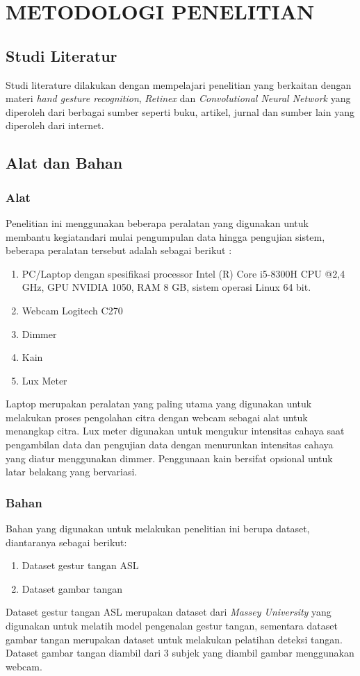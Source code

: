 \chapter{METODOLOGI PENELITIAN}
\section{Studi Literatur}
Studi literature dilakukan dengan mempelajari penelitian yang berkaitan dengan materi \emph{hand gesture recognition}, \emph{Retinex} dan \emph{Convolutional Neural Network} yang  diperoleh dari berbagai sumber seperti buku, artikel, jurnal dan sumber lain yang diperoleh dari internet.
\section{Alat dan Bahan}
\subsection{Alat}
Penelitian ini menggunakan beberapa peralatan yang digunakan untuk membantu kegiatandari mulai pengumpulan data hingga pengujian sistem, beberapa peralatan tersebut adalah sebagai berikut :
\begin{enumerate}
\item PC/Laptop dengan spesifikasi processor Intel (R) Core i5-8300H CPU @2,4 GHz, GPU NVIDIA 1050, RAM 8 GB, sistem operasi Linux 64 bit.
\item Webcam Logitech C270
\item Dimmer
\item Kain	
\item Lux Meter
\end{enumerate}
Laptop merupakan peralatan yang paling utama yang digunakan untuk melakukan proses pengolahan citra dengan webcam sebagai alat untuk menangkap citra. Lux meter digunakan untuk mengukur intensitas cahaya saat pengambilan data dan pengujian data dengan menurunkan intensitas cahaya yang diatur menggunakan dimmer. Penggunaan kain bersifat opsional untuk latar belakang yang bervariasi.
\subsection{Bahan}
Bahan yang digunakan untuk melakukan penelitian ini berupa dataset, diantaranya sebagai berikut:
\begin{enumerate}
	\item Dataset gestur tangan ASL 
	\item Dataset gambar tangan
\end{enumerate}
Dataset gestur tangan ASL merupakan dataset dari \emph{Massey University} yang digunakan untuk melatih model pengenalan gestur tangan, sementara dataset gambar tangan merupakan dataset untuk melakukan pelatihan deteksi tangan. Dataset gambar tangan diambil dari 3 subjek yang diambil gambar menggunakan webcam.
